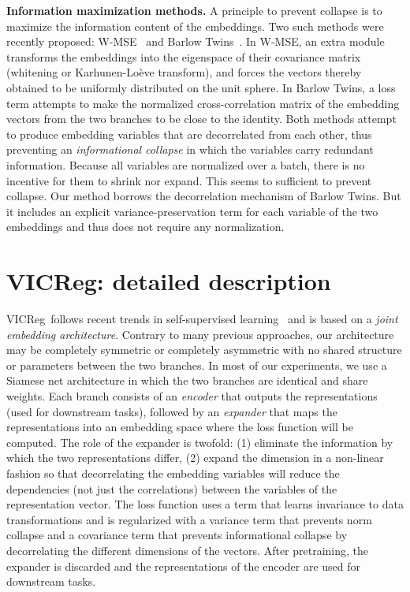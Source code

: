 \documentclass{article}
\newcommand{\algo}{VICReg}
\newcommand{\expander}{expander }
\begin{document}
\vspace{2mm}
\noindent \textbf{Information maximization methods.} A principle to prevent collapse is to maximize the information content of the embeddings. Two such methods were recently proposed: W-MSE~\cite{ermolov2021whitening} and Barlow Twins~\cite{zbontar2021barlow}.
In W-MSE, an extra module transforms the embeddings into the eigenspace of their covariance matrix (whitening or Karhunen-Loève transform), and forces the vectors thereby obtained to be uniformly distributed on the unit sphere.
In Barlow Twins, a loss term attempts to make the normalized cross-correlation matrix of the embedding vectors from the two branches to be close to the identity. 
Both methods attempt to produce embedding variables that are decorrelated from each other, thus preventing an {\em informational collapse} in which the variables carry redundant information. Because all variables are normalized over a batch, there is no incentive for them to shrink nor expand. This seems to sufficient to prevent collapse.
Our method borrows the decorrelation mechanism of Barlow Twins. But it includes an explicit variance-preservation term for each variable of the two embeddings and thus does not require any normalization.
    
\section{VICReg: detailed description} \label{sec:method}

\algo \ follows recent trends in self-supervised learning~\cite{caron2020swav, grill2020byol, chen2020simsiam, zbontar2021barlow, chen2020simclr} and is based on a {\em joint embedding architecture}. Contrary to many previous approaches, our architecture may be completely symmetric or completely asymmetric with no shared structure or parameters between the two branches. In most of our experiments, we use a Siamese net architecture in which the two branches are identical and share weights. Each branch consists of an {\em encoder}  that outputs the representations (used for downstream tasks), followed by an {\em expander}  that maps the representations into an embedding space where the loss function will be computed. The role of the \expander is twofold: (1) eliminate the information by which the two representations differ, (2) expand the dimension in a non-linear fashion so that decorrelating the embedding variables will reduce the dependencies (not just the correlations) between the variables of the representation vector. The loss function uses a term  that learns invariance to data transformations and is regularized with a variance term  that prevents norm collapse and a covariance term  that prevents informational collapse by decorrelating the different dimensions of the vectors. After pretraining, the \expander is discarded and the representations of the encoder are used for downstream tasks.
\end{document}
